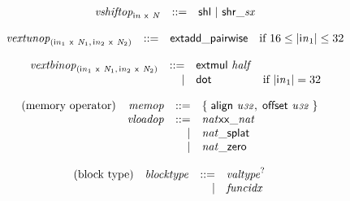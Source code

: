 $$
\begin{array}{@{}lrrl@{}l@{}}
& {{\mathit{vshiftop}}}_{{\mathsf{i}}{{\mathit{n}}}~\mathsf{x}~{\mathit{N}}} &::=& \mathsf{shl} ~|~ {\mathsf{shr\_}}{{\mathit{sx}}} \\
\end{array}
$$

$$
\begin{array}{@{}lrrl@{}l@{}}
& {{\mathit{vextunop}}}_{({{\mathsf{i}}{{\mathit{n}}}}_{{1}}~\mathsf{x}~{\mathit{N}}_{{1}},\, {{\mathsf{i}}{{\mathit{n}}}}_{{2}}~\mathsf{x}~{\mathit{N}}_{{2}})} &::=& \mathsf{extadd\_pairwise} &\quad
  \mbox{if}~16 \leq {|{{\mathsf{i}}{{\mathit{n}}}}_{{1}}|} \leq 32 \\
\end{array}
$$

$$
\begin{array}{@{}lrrl@{}l@{}}
& {{\mathit{vextbinop}}}_{({{\mathsf{i}}{{\mathit{n}}}}_{{1}}~\mathsf{x}~{\mathit{N}}_{{1}},\, {{\mathsf{i}}{{\mathit{n}}}}_{{2}}~\mathsf{x}~{\mathit{N}}_{{2}})} &::=& \mathsf{extmul}~{\mathit{half}} \\ &&|&
\mathsf{dot} &\quad
  \mbox{if}~{|{{\mathsf{i}}{{\mathit{n}}}}_{{1}}|} = 32 \\
\end{array}
$$

\vspace{1ex}

$$
\begin{array}{@{}lrrl@{}l@{}}
\mbox{(memory operator)} & {\mathit{memop}} &::=& \{\; \begin{array}[t]{@{}l@{}l@{}}
\mathsf{align}~{\mathit{u{\scriptstyle32}}},\; \mathsf{offset}~{\mathit{u{\scriptstyle32}}} \;\}\end{array} \\
& {\mathit{vloadop}} &::=& {{{{{\mathit{nat}}}{\mathsf{x}}}{\mathsf{x}}}{\mathsf{\_}}}{{\mathit{nat}}} \\ &&|&
{{{\mathit{nat}}}{\mathsf{\_}}}{\mathsf{splat}} \\ &&|&
{{{\mathit{nat}}}{\mathsf{\_}}}{\mathsf{zero}} \\
\end{array}
$$

\vspace{1ex}

$$
\begin{array}{@{}lrrl@{}l@{}}
\mbox{(block type)} & {\mathit{blocktype}} &::=& {{\mathit{valtype}}^?} \\ &&|&
{\mathit{funcidx}} \\
\end{array}
$$

